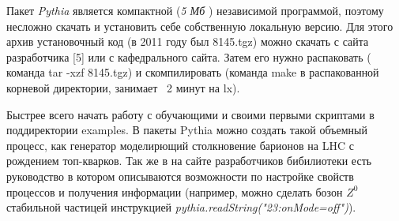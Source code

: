 Пакет \textit{Pythia} является компактной (\textit{5 Мб} )
независимой программой, поэтому несложно скачать и
установить себе собственную локальную версию. Для этого
архив установочный код (в 2011 году был 8145.tgz) можно
скачать с сайта разработчика [5] или с кафедрального сайта.
Затем его нужно распаковать ( команда tar -xzf 8145.tgz)
и скомпилировать (команда make в распакованной корневой
директории, занимает ~2 минут на lx).

Быстрее всего начать работу с обучающими и своими
первыми скриптами в поддиректории examples. В пакеты Pythia можно создать такой объемный процесс, как генератор
моделирющий столкновение барионов на LHC с рождением
топ-кварков. Так же в на сайте разработчиков бибилиотеки есть руководство в котором описываются возможности по настройке
свойств процессов и получения информации (например,
можно сделать бозон ${Z}^0$ стабильной частицей инструкцией \textit{pythia.readString("23:onMode=off")}). 

